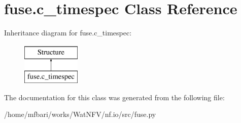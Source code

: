 \hypertarget{classfuse_1_1c__timespec}{\section{fuse.\-c\-\_\-timespec Class Reference}
\label{classfuse_1_1c__timespec}
}
Inheritance diagram for fuse.\-c\-\_\-timespec\-:\begin{figure}[H]
\begin{center}
\leavevmode
\includegraphics[height=2.000000cm]{classfuse_1_1c__timespec}
\end{center}
\end{figure}


The documentation for this class was generated from the following file\-:\begin{DoxyCompactItemize}
\item 
/home/mfbari/works/\-Wat\-N\-F\-V/nf.\-io/src/fuse.\-py\end{DoxyCompactItemize}
